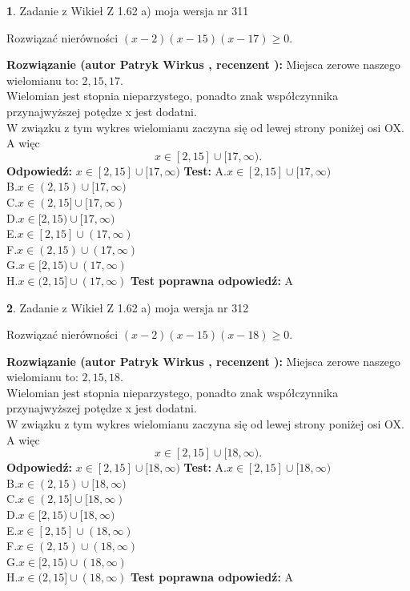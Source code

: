 \documentclass[12pt, a4paper]{article}
\theoremstyle{definition} %
\newtheorem{zad}{}
\newcommand{\zadStart}[1]{\begin{zad}#1\newline}
\newcommand{\zadStop}{\end{zad}}
\newcommand{\rozwStart}[2]{\noindent \textbf{Rozwiązanie (autor #1 , recenzent #2): }\newline}
\newcommand{\rozwStop}{\newline}
\newcommand{\odpStart}{\noindent \textbf{Odpowiedź:}\newline}
\newcommand{\odpStop}{\newline}
\newcommand{\testStart}{\noindent \textbf{Test:}\newline}
\newcommand{\testStop}{\newline}
\newcommand{\kluczStart}{\noindent \textbf{Test poprawna odpowiedź:}\newline}
\newcommand{\kluczStop}{\newline}
\begin{document}
\zadStart{Zadanie z Wikieł Z 1.62 a) moja wersja nr 311}

Rozwiązać nierówności $(x-2)(x-15)(x-17)\ge0$.
\zadStop
\rozwStart{Patryk Wirkus}{}
Miejsca zerowe naszego wielomianu to: $2, 15, 17$.\\
Wielomian jest stopnia nieparzystego, ponadto znak współczynnika przy\linebreak najwyższej potędze x jest dodatni.\\ W związku z tym wykres wielomianu zaczyna się od lewej strony poniżej osi OX. A więc $$x \in [2,15] \cup [17,\infty).$$
\rozwStop
\odpStart
$x \in [2,15] \cup [17,\infty)$
\odpStop
\testStart
A.$x \in [2,15] \cup [17,\infty)$\\
B.$x \in (2,15) \cup [17,\infty)$\\
C.$x \in (2,15] \cup [17,\infty)$\\
D.$x \in [2,15) \cup [17,\infty)$\\
E.$x \in [2,15] \cup (17,\infty)$\\
F.$x \in (2,15) \cup (17,\infty)$\\
G.$x \in [2,15) \cup (17,\infty)$\\
H.$x \in (2,15] \cup (17,\infty)$
\testStop
\kluczStart
A
\kluczStop



\zadStart{Zadanie z Wikieł Z 1.62 a) moja wersja nr 312}

Rozwiązać nierówności $(x-2)(x-15)(x-18)\ge0$.
\zadStop
\rozwStart{Patryk Wirkus}{}
Miejsca zerowe naszego wielomianu to: $2, 15, 18$.\\
Wielomian jest stopnia nieparzystego, ponadto znak współczynnika przy\linebreak najwyższej potędze x jest dodatni.\\ W związku z tym wykres wielomianu zaczyna się od lewej strony poniżej osi OX. A więc $$x \in [2,15] \cup [18,\infty).$$
\rozwStop
\odpStart
$x \in [2,15] \cup [18,\infty)$
\odpStop
\testStart
A.$x \in [2,15] \cup [18,\infty)$\\
B.$x \in (2,15) \cup [18,\infty)$\\
C.$x \in (2,15] \cup [18,\infty)$\\
D.$x \in [2,15) \cup [18,\infty)$\\
E.$x \in [2,15] \cup (18,\infty)$\\
F.$x \in (2,15) \cup (18,\infty)$\\
G.$x \in [2,15) \cup (18,\infty)$\\
H.$x \in (2,15] \cup (18,\infty)$
\testStop
\kluczStart
A
\kluczStop
\end{document}
